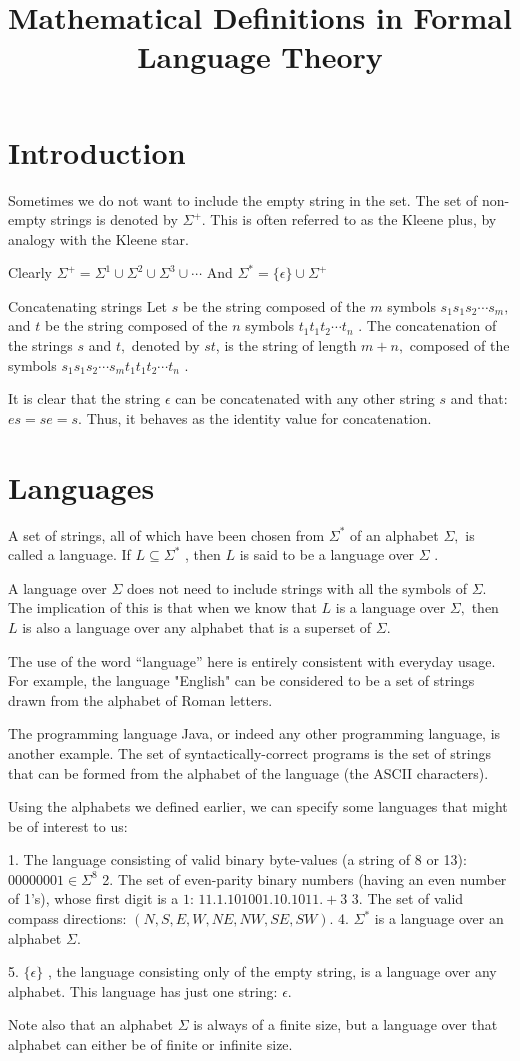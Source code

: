 \documentclass{article}
\title{Mathematical Definitions in Formal Language Theory}
\author{}
\date{}
\begin{document}
\section*{Introduction}
Sometimes we do not want to include the empty string in the set. The set of non-empty strings is denoted by $\Sigma^{+}$. This is often referred to as the Kleene plus, by analogy with the Kleene star.

Clearly $\Sigma^{+}=\Sigma^{1} \cup\Sigma^{2} \cup\Sigma^{3} \cup\cdots$ 
And $\Sigma^{*}=\{\epsilon\} \cup\Sigma^{+}$

Concatenating strings
Let $s$ be the string composed of the $m$ symbols $s_{1} s_{1} s_{2} \cdots s_{m},$ and $t$ be the string composed of the $n$ symbols $t_{1} t_{1} t_{2} \cdots t_{n}$ . The concatenation of the strings $s$ and $t,$ denoted by $st$, is the string of length $m+n,$ composed of the symbols $s_{1} s_{1} s_{2} \cdots s_{m} t_{1} t_{1} t_{2} \cdots t_{n}$ .

It is clear that the string $\epsilon$ can be concatenated with any other string $s$ and that: $es = se = s$.  Thus, it behaves as the identity value for concatenation.

\section{Languages}

A set of strings, all of which have been chosen from $\Sigma^{*}$ of an alphabet $\Sigma,$ is called a language. If $L \subseteq\Sigma^{*}$ , then $L$ is said to be a language over $\Sigma$ .

A language over ${\Sigma}$ does not need to include strings with  all the symbols of $\Sigma$. The implication of this is that when we know that $L$ is a language over $\Sigma,$ then $L$ is also a language over any alphabet that is a superset of $\Sigma$.

The use of the word “language” here is entirely consistent with everyday usage. For example, the language "English" can be considered to be a set of strings drawn from the alphabet of Roman letters.

The programming language Java, or indeed any other programming language, is another example. The set of syntactically-correct programs is the set of strings that can be formed from the alphabet of the language (the ASCII characters).

Using the alphabets we defined earlier, we can specify some languages that might be of interest to us:

1. The language consisting of valid binary byte-values (a string of 8 or 13):
$00000001 \in \Sigma^{8}$
2. The set of even-parity binary numbers (having an even number of 1's), whose first digit is a $1$: 
$11.1.101001.10.1011.+3$
3. The set of valid compass directions: $(N, S, E, W, NE, NW, SE, SW)$.
4. $\Sigma^{*}$ is a language over an alphabet $\Sigma$.

5. $\{\epsilon\}$ , the language consisting only of the empty string, is a language over any alphabet. This language has just one string: $\epsilon$.

Note also that an alphabet $\Sigma$ is always of a finite size, but a language over that alphabet can either be of finite or infinite size.
\end{document}
